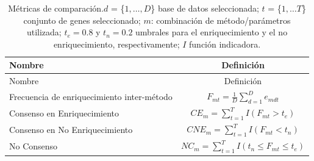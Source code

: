 \documentclass[12pt,twoside]{reedthesis}
\begin{document}
\begin{longtable}[]{@{}lc@{}}
\caption{Métricas de comparación.\label{tab:comparisonMetrics}
\(d\) = \{\(1,\ldots,D\)\} base de datos seleccionada; \(t\) = \{\(1,\ldots T\)\} conjunto de genes seleccionado; \(m\): combinación de método/parámetros utilizada; \(t_e=0.8\) y \(t_n=0.2\) umbrales para el enriquecimiento y el no enriquecimiento, respectivamente; \(I\) función indicadora.}\tabularnewline
\toprule
\begin{minipage}[b]{0.44\columnwidth}\raggedright
Nombre\strut
\end{minipage} & \begin{minipage}[b]{0.50\columnwidth}\centering
Definición\strut
\end{minipage}\tabularnewline
\midrule
\endfirsthead
\toprule
\begin{minipage}[b]{0.44\columnwidth}\raggedright
Nombre\strut
\end{minipage} & \begin{minipage}[b]{0.50\columnwidth}\centering
Definición\strut
\end{minipage}\tabularnewline
\midrule
\endhead
\begin{minipage}[t]{0.44\columnwidth}\raggedright
Frecuencia de enriquecimiento inter-método\strut
\end{minipage} & \begin{minipage}[t]{0.50\columnwidth}\centering
\(F_{mt}=\frac{1}{D}\sum_{d=1}^{D}e_{mdt}\)\strut
\end{minipage}\tabularnewline
\begin{minipage}[t]{0.44\columnwidth}\raggedright
Consenso en Enriquecimiento\strut
\end{minipage} & \begin{minipage}[t]{0.50\columnwidth}\centering
\(CE_m=\sum_{t=1}^{T}I(F_{mt} > t_e)\)\strut
\end{minipage}\tabularnewline
\begin{minipage}[t]{0.44\columnwidth}\raggedright
Consenso en No Enriquecimiento\strut
\end{minipage} & \begin{minipage}[t]{0.50\columnwidth}\centering
\(CNE_m=\sum_{t=1}^{T}I(F_{mt} < t_n)\)\strut
\end{minipage}\tabularnewline
\begin{minipage}[t]{0.44\columnwidth}\raggedright
No Consenso\strut
\end{minipage} & \begin{minipage}[t]{0.50\columnwidth}\centering
\(NC_m=\sum_{t=1}^{T}I(t_n \leq F_{mt} \leq t_e)\)\strut

\end{minipage}
\end{longtable}
\end{document}
